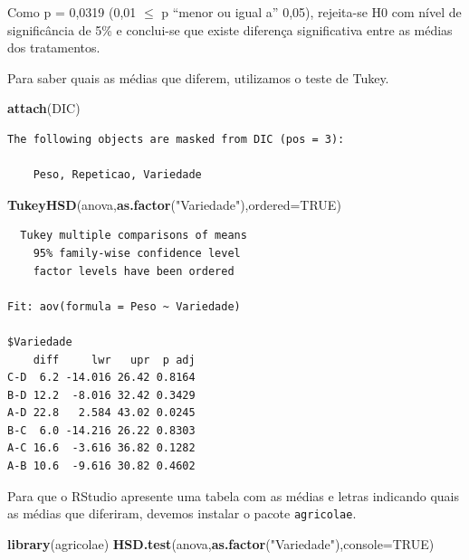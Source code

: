 \documentclass[12pt,brazil,oneside]{book}
\newenvironment{Shaded}{\begin{snugshade}}{\end{snugshade}}
\newcommand{\DataTypeTok}[1]{\textcolor[rgb]{0.13,0.29,0.53}{#1}}
\newcommand{\KeywordTok}[1]{\textcolor[rgb]{0.13,0.29,0.53}{\textbf{#1}}}
\newcommand{\NormalTok}[1]{#1}
\newcommand{\OtherTok}[1]{\textcolor[rgb]{0.56,0.35,0.01}{#1}}
\newcommand{\StringTok}[1]{\textcolor[rgb]{0.31,0.60,0.02}{#1}}
\begin{document}
Como p = 0,0319 (0,01 \(\leq\) p ``menor ou igual a'' 0,05), rejeita-se
H0 com nível de significância de 5\% e conclui-se que existe diferença
significativa entre as médias dos tratamentos.

Para saber quais as médias que diferem, utilizamos o teste de Tukey.

\begin{Shaded}
\begin{Highlighting}[]
\KeywordTok{attach}\NormalTok{(DIC)}
\end{Highlighting}
\end{Shaded}

\begin{verbatim}
The following objects are masked from DIC (pos = 3):

    Peso, Repeticao, Variedade
\end{verbatim}

\begin{Shaded}
\begin{Highlighting}[]
\KeywordTok{TukeyHSD}\NormalTok{(anova,}\KeywordTok{as.factor}\NormalTok{(}\StringTok{"Variedade"}\NormalTok{),}\DataTypeTok{ordered=}\OtherTok{TRUE}\NormalTok{)}
\end{Highlighting}
\end{Shaded}

\begin{verbatim}
  Tukey multiple comparisons of means
    95% family-wise confidence level
    factor levels have been ordered

Fit: aov(formula = Peso ~ Variedade)

$Variedade
    diff     lwr   upr  p adj
C-D  6.2 -14.016 26.42 0.8164
B-D 12.2  -8.016 32.42 0.3429
A-D 22.8   2.584 43.02 0.0245
B-C  6.0 -14.216 26.22 0.8303
A-C 16.6  -3.616 36.82 0.1282
A-B 10.6  -9.616 30.82 0.4602
\end{verbatim}

Para que o RStudio apresente uma tabela com as médias e letras indicando
quais as médias que diferiram, devemos instalar o pacote
\texttt{agricolae}.

\begin{Shaded}
\begin{Highlighting}[]
\KeywordTok{library}\NormalTok{(agricolae)}
\KeywordTok{HSD.test}\NormalTok{(anova,}\KeywordTok{as.factor}\NormalTok{(}\StringTok{"Variedade"}\NormalTok{),}\DataTypeTok{console=}\OtherTok{TRUE}\NormalTok{)}
\end{Highlighting}
\end{Shaded}
\end{document}
